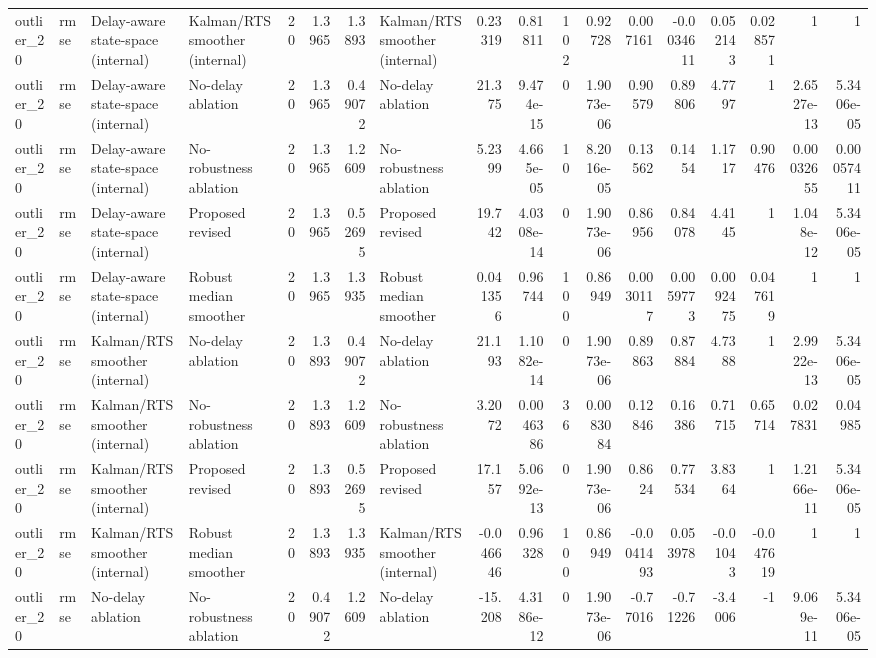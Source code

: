 \begin{table}[!htbp]
{\begin{tabular}{llllrrrlrrrrrrrrrr}
outlier_20 & rmse & Delay-aware state-space (internal) & Kalman/RTS smoother (internal) & 20 & 1.3965 & 1.3893 & Kalman/RTS smoother (internal) & 0.23319 & 0.81811 & 102 & 0.92728 & 0.007161 & -0.0034611 & 0.052143 & 0.028571 & 1 & 1 \\
outlier_20 & rmse & Delay-aware state-space (internal) & No-delay ablation & 20 & 1.3965 & 0.49072 & No-delay ablation & 21.375 & 9.474e-15 & 0 & 1.9073e-06 & 0.90579 & 0.89806 & 4.7797 & 1 & 2.6527e-13 & 5.3406e-05 \\
outlier_20 & rmse & Delay-aware state-space (internal) & No-robustness ablation & 20 & 1.3965 & 1.2609 & No-robustness ablation & 5.2399 & 4.665e-05 & 10 & 8.2016e-05 & 0.13562 & 0.1454 & 1.1717 & 0.90476 & 0.00032655 & 0.00057411 \\
outlier_20 & rmse & Delay-aware state-space (internal) & Proposed revised & 20 & 1.3965 & 0.52695 & Proposed revised & 19.742 & 4.0308e-14 & 0 & 1.9073e-06 & 0.86956 & 0.84078 & 4.4145 & 1 & 1.048e-12 & 5.3406e-05 \\
outlier_20 & rmse & Delay-aware state-space (internal) & Robust median smoother & 20 & 1.3965 & 1.3935 & Robust median smoother & 0.041356 & 0.96744 & 100 & 0.86949 & 0.0030117 & 0.0059773 & 0.0092475 & 0.047619 & 1 & 1 \\
outlier_20 & rmse & Kalman/RTS smoother (internal) & No-delay ablation & 20 & 1.3893 & 0.49072 & No-delay ablation & 21.193 & 1.1082e-14 & 0 & 1.9073e-06 & 0.89863 & 0.87884 & 4.7388 & 1 & 2.9922e-13 & 5.3406e-05 \\
outlier_20 & rmse & Kalman/RTS smoother (internal) & No-robustness ablation & 20 & 1.3893 & 1.2609 & No-robustness ablation & 3.2072 & 0.0046386 & 36 & 0.0083084 & 0.12846 & 0.16386 & 0.71715 & 0.65714 & 0.027831 & 0.04985 \\
outlier_20 & rmse & Kalman/RTS smoother (internal) & Proposed revised & 20 & 1.3893 & 0.52695 & Proposed revised & 17.157 & 5.0692e-13 & 0 & 1.9073e-06 & 0.8624 & 0.77534 & 3.8364 & 1 & 1.2166e-11 & 5.3406e-05 \\
outlier_20 & rmse & Kalman/RTS smoother (internal) & Robust median smoother & 20 & 1.3893 & 1.3935 & Kalman/RTS smoother (internal) & -0.046646 & 0.96328 & 100 & 0.86949 & -0.0041493 & 0.053978 & -0.01043 & -0.047619 & 1 & 1 \\
outlier_20 & rmse & No-delay ablation & No-robustness ablation & 20 & 0.49072 & 1.2609 & No-delay ablation & -15.208 & 4.3186e-12 & 0 & 1.9073e-06 & -0.77016 & -0.71226 & -3.4006 & -1 & 9.069e-11 & 5.3406e-05 \\

\end{tabular}}
\end{table}
